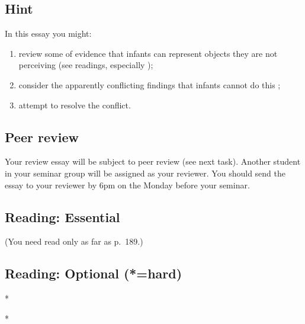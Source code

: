 \documentclass[12pt,\papersize]{extarticle}
\begin{document}
\subsection{Hint}
In this essay you might:
\begin{enumerate}
\item review some of evidence that infants can represent objects they are not perceiving (see readings, especially \citealp{baillargeon:1987_object});
\item consider the apparently conflicting findings that infants cannot do this \citep{Shinskey:2001fk};
\item attempt to resolve the conflict.
\end{enumerate}
%


\subsection{Peer review}
Your review essay will be subject to peer review (see next task).
Another student in your seminar group will be assigned as your reviewer.
You should send the essay to your reviewer by 6pm on the Monday before your seminar.



\subsection{Reading: Essential}




  (You need read only as far as p.\ 189.)



\subsection{Reading: Optional (*=hard)}


*


*
\end{document}
